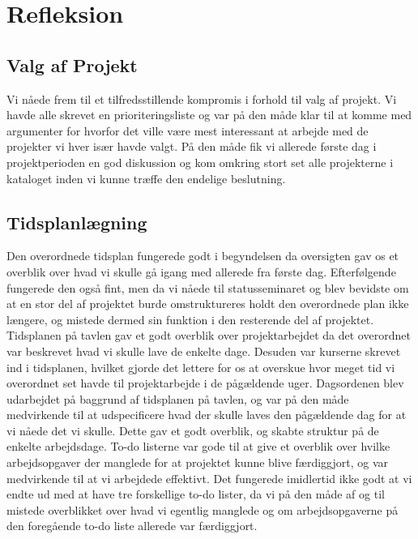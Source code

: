 \section{Refleksion}

\subsection{Valg af Projekt}
Vi nåede frem til et tilfredsstillende kompromis i forhold til valg af projekt. Vi havde alle skrevet en prioriteringsliste og var på den måde klar til at komme med argumenter for hvorfor det ville være mest interessant at arbejde med de projekter vi hver især havde valgt. På den måde fik vi allerede første dag i projektperioden en god diskussion og kom omkring stort set alle projekterne i kataloget inden vi kunne træffe den endelige beslutning. 

\subsection{Tidsplanlægning}
Den overordnede tidsplan fungerede godt i begyndelsen da oversigten gav os et overblik over hvad vi skulle gå igang med allerede fra første dag. Efterfølgende fungerede den også fint, men da vi nåede til statusseminaret og blev bevidste om at en stor del af projektet burde omstruktureres holdt den overordnede plan ikke længere, og mistede dermed sin funktion i den resterende del af projektet. 
Tidsplanen på tavlen gav et godt overblik over projektarbejdet da det overordnet var beskrevet hvad vi skulle lave de enkelte dage. Desuden var kurserne skrevet ind i tidsplanen, hvilket gjorde det lettere for os at overskue hvor meget tid vi overordnet set havde til projektarbejde i de pågældende uger. 
Dagsordenen blev udarbejdet på baggrund af tidsplanen på tavlen, og var på den måde medvirkende til at udspecificere hvad der skulle laves den pågældende dag for at vi nåede det vi skulle. Dette gav et godt overblik, og skabte struktur på de enkelte arbejdsdage.
To-do listerne var gode til at give et overblik over hvilke arbejdsopgaver der manglede for at projektet kunne blive færdiggjort, og var medvirkende til at vi arbejdede effektivt. Det fungerede imidlertid ikke godt at vi endte ud med at have tre forskellige to-do lister, da vi på den måde af og til mistede overblikket over hvad vi egentlig manglede og om arbejdsopgaverne på den foregående to-do liste allerede var færdiggjort.

